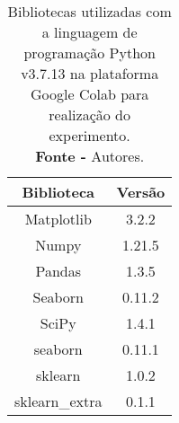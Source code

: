 \begin{table}[H]
\centering
\begin{tabular}{@{}cc@{}}
\toprule
\textbf{Biblioteca} & \textbf{Versão} \\ \midrule
Matplotlib          & 3.2.2           \\
Numpy               & 1.21.5          \\
Pandas              & 1.3.5           \\
Seaborn             & 0.11.2          \\
SciPy               & 1.4.1           \\
seaborn	            & 0.11.1          \\
sklearn	            & 1.0.2           \\
sklearn\_extra       & 0.1.1           \\  \bottomrule
\end{tabular}
\caption{Bibliotecas utilizadas com a linguagem de programação Python v3.7.13 na plataforma Google Colab para realização do experimento. \\ \textbf{Fonte -} Autores.}
\label{tab: bibliotecas-python}
\end{table}
